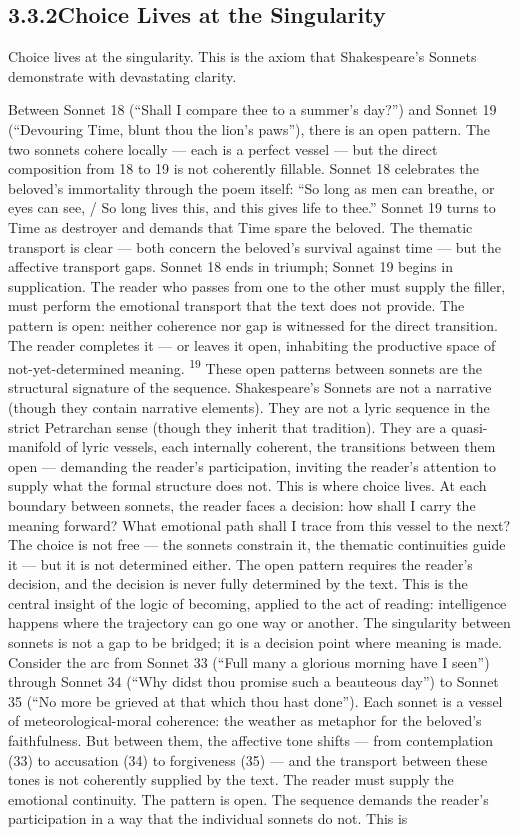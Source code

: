 \subsection{3.3.2\quad Choice Lives at the Singularity}

Choice lives at the singularity. This is the axiom that Shakespeare’s Sonnets demonstrate with devastating clarity.

Between Sonnet 18 (“Shall I compare thee to a summer’s day?”) and Sonnet 19 (“Devouring Time, blunt thou the lion’s paws”), there is an open pattern. The two sonnets cohere locally — each is a perfect vessel — but the direct composition from 18 to 19 is not coherently fillable. Sonnet 18 celebrates the beloved’s immortality through the poem itself: “So long as men can breathe, or eyes can see, / So long lives this, and this gives life to thee.” Sonnet 19 turns to Time as destroyer and demands that Time spare the beloved. The thematic transport is clear — both concern the beloved’s survival against time — but the affective transport gaps. Sonnet 18 ends in triumph; Sonnet 19 begins in supplication. The reader who passes from one to the other must supply the filler, must perform the emotional transport that the text does not provide. The pattern is open: neither coherence nor gap is witnessed for the direct transition. The reader completes it — or leaves it open, inhabiting the productive space of not-yet-determined meaning. \textsuperscript{19} These open patterns between sonnets are the structural signature of the sequence. Shakespeare’s Sonnets are not a narrative (though they contain narrative elements). They are not a lyric sequence in the strict Petrarchan sense (though they inherit that tradition). They are a quasi-manifold of lyric vessels, each internally coherent, the transitions between them open — demanding the reader’s participation, inviting the reader’s attention to supply what the formal structure does not. This is where choice lives. At each boundary between sonnets, the reader faces a decision: how shall I carry the meaning forward? What emotional path shall I trace from this vessel to the next? The choice is not free — the sonnets constrain it, the thematic continuities guide it — but it is not determined either. The open pattern requires the reader’s decision, and the decision is never fully determined by the text. This is the central insight of the logic of becoming, applied to the act of reading: intelligence happens where the trajectory can go one way or another. The singularity between sonnets is not a gap to be bridged; it is a decision point where meaning is made. Consider the arc from Sonnet 33 (“Full many a glorious morning have I seen”) through Sonnet 34 (“Why didst thou promise such a beauteous day”) to Sonnet 35 (“No more be grieved at that which thou hast done”). Each sonnet is a vessel of meteorological-moral coherence: the weather as metaphor for the beloved’s faithfulness. But between them, the affective tone shifts — from contemplation (33) to accusation (34) to forgiveness (35) — and the transport between these tones is not coherently supplied by the text. The reader must supply the emotional continuity. The pattern is open. The sequence demands the reader’s participation in a way that the individual sonnets do not. This is 